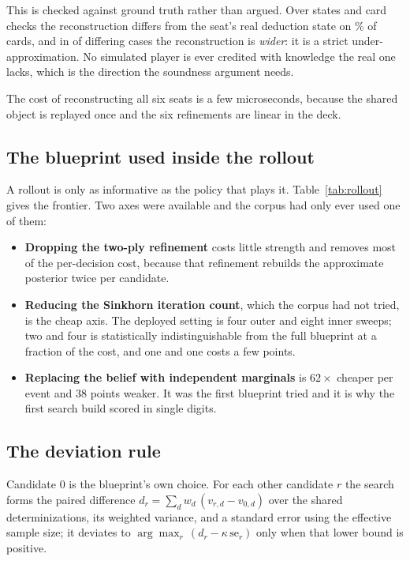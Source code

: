 This is checked against ground truth rather than argued. Over \vsixReconStates{} states and \vsixReconChecks{} card
checks the reconstruction differs from the seat's real deduction state on \vsixReconMaskPct\% of
cards, and in \vsixReconWider{} of \vsixReconWider{} differing cases the reconstruction is \emph{wider}: it is a strict under-approximation.
No simulated player is ever credited with knowledge the real one lacks, which is the direction the
soundness argument needs.

The cost of reconstructing all six seats is a few microseconds, because the shared object is
replayed once and the six refinements are linear in the deck.

\subsection{The blueprint used inside the rollout}
\label{app:search-blueprint}

A rollout is only as informative as the policy that plays it. Table~\ref{tab:rollout} gives the
frontier. Two axes were available and the corpus had only ever used one of them:

\begin{itemize}
\item \textbf{Dropping the two-ply refinement} costs little strength and removes most of the
  per-decision cost, because that refinement rebuilds the approximate posterior twice per candidate.
\item \textbf{Reducing the Sinkhorn iteration count}, which the corpus had not tried, is the cheap
  axis. The deployed setting is four outer and eight inner sweeps; two and four is statistically
  indistinguishable from the full blueprint at a fraction of the cost, and one and one costs a few
  points.
\item \textbf{Replacing the belief with independent marginals} is $62\times$ cheaper per event and
  $38$ points weaker. It was the first blueprint tried and it is why the first search build scored
  in single digits.
\end{itemize}

\subsection{The deviation rule}
\label{app:search-guard}

Candidate $0$ is the blueprint's own choice. For each other candidate $r$ the search forms the
paired difference $d_r = \sum_d w_d\,(v_{r,d} - v_{0,d})$ over the shared determinizations, its
weighted variance, and a standard error using the effective sample size; it deviates to
$\arg\max_r\, (d_r - \kappa\,\mathrm{se}_r)$ only when that lower bound is positive.

